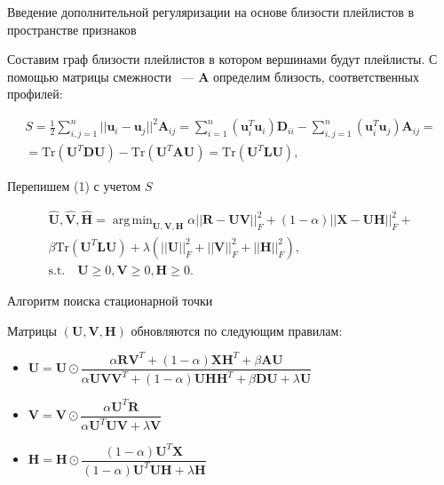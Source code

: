 \documentclass{beamer}
\DeclareMathOperator*{\argmin}{arg\,min}
\begin{document}
\begin{frame}{Введение дополнительной регуляризации на основе близости плейлистов в пространстве признаков}

Составим граф близости плейлистов в котором вершинами будут плейлисты. С помощью матрицы смежности ~--- $\mathbf{A}$ определим близость, соответственных профилей:

\begin{equation}
\begin{gathered}
S = \frac{1}{2}\sum_{i, j = 1}^n||\mathbf{u}_i - \mathbf{u}_j||^2\mathbf{A}_{ij} = \sum_{i = 1}^n (\mathbf{u}_i^{T}\mathbf{u}_i)\mathbf{D}_{ii} - \sum_{i,j = 1}^n (\mathbf{u}_i^{T}\mathbf{u}_j)\mathbf{A}_{ij} =\\= \text{Tr}(\mathbf{U}^{T}\mathbf{DU}) -  \text{Tr}(\mathbf{U}^{T}\mathbf{AU}) = \text{Tr}(\mathbf{U}^{T}\mathbf{LU}),
\end{gathered}
\end{equation}

Перепишем (1) с учетом $S$

\begin{equation}
\begin{gathered}
\hat{\mathbf{U}}, \hat{\mathbf{V}}, \hat{\mathbf{H}} = \argmin_{\mathbf{U, V, H}}\alpha||\mathbf{R} - \mathbf{UV}||_F^2 +(1 - \alpha) ||\mathbf{X} - \mathbf{UH}||_F^2 + \\ \beta\text{Tr}(\mathbf{U}^T\mathbf{LU}) +  \lambda(||\mathbf{U}||_F^2 + ||\mathbf{V}||_F^2 + ||\mathbf{H}||_F^2),\\
\text{s.t.} \quad \mathbf{U} \geq 0,  \mathbf{V} \geq 0,  \mathbf{H} \geq 0.
\end{gathered}
\end{equation}

\end{frame}
\begin{frame}{Алгоритм поиска стационарной точки}

Матрицы $(\mathbf{U, V, H})$ обновляются по следующим правилам:

\begin{itemize}
\item$\mathbf{U} = \mathbf{U} \odot \dfrac{\alpha\mathbf{R}\mathbf{V}^T + (1 -\alpha)\mathbf{X}\mathbf{H}^T + \beta\mathbf{AU}}{\alpha\mathbf{UV}\mathbf{V}^T + (1 - \alpha)\mathbf{UH}\mathbf{H}^T + \beta\mathbf{DU} + \lambda\mathbf{U}}$

\item$\mathbf{V} = \mathbf{V} \odot \dfrac{\alpha\mathbf{U}^T\mathbf{R}}{\alpha\mathbf{U}^T\mathbf{UV} + \lambda\mathbf{V}}$

\item$\mathbf{H} = \mathbf{H} \odot \dfrac{(1 - \alpha)\mathbf{U}^T\mathbf{X}}{(1 - \alpha)\mathbf{U}^T\mathbf{UH} + \lambda\mathbf{H}}$
\end{itemize}

\end{frame}
\end{document}
